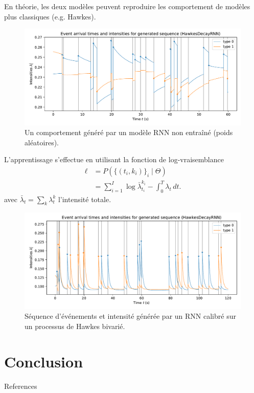 \documentclass{beamer}
\begin{document}
\begin{frame}
En théorie, les deux modèles peuvent reproduire les comportement de modèles plus classiques (e.g. Hawkes).

\begin{figure}
	\includegraphics[width=\linewidth]{../notebooks/example_rnnplot2d_hidden128.pdf}
	\caption{Un comportement généré par un modèle RNN non entraîné (poids aléatoires).}\label{fig:untrained1DRNNIntensity}
\end{figure}
	
\end{frame}

\begin{frame}
L'apprentissage s'effectue en utilisant la fonction de log-vraisemblance
\begin{equation}\label{eq:logLikelihood}
\begin{aligned}
\ell &= P\left( \{(t_i,k_i)\}_i \mid \Theta \right) \\
&= \sum_{i=1}^{I}\log \bar{\lambda}^{k_i}_{t_i} - \int_0^T \lambda_t\,dt.
\end{aligned}
\end{equation}
avec $\bar{\lambda}_t = \sum_k \lambda^k_t$ l'intensité totale.
\end{frame}

\begin{frame}
\begin{figure}
	\includegraphics[width=\linewidth]{../results/intensity_HawkesDecayRNN_2d_hidden128_20181209-132014.pdf}
	\caption{Séquence d'événements et intensité générée par un RNN calibré sur un processus de Hawkes bivarié.}
\end{figure}
\end{frame}

\section{Conclusion}

\begin{frame}[t,allowframebreaks]{References}
	\printbibliography
\end{frame}
\end{document}
